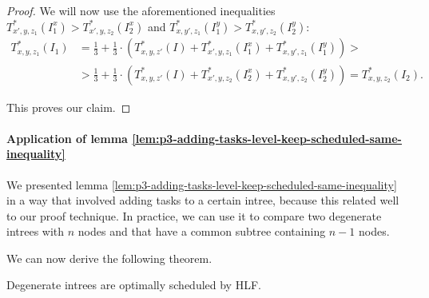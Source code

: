 \begin{proof}
  We will now use the aforementioned inequalities $T^*_{x',y,z_1}(I^x_{1}) > T^*_{x',y,z_2}(I^x_{2})$ and $T^*_{x,y',z_1}(I^y_{1}) > T^*_{x,y',z_2}(I^y_{2})$:
\begin{align*}
    T^*_{x,y,z_1}(I_1) & = 
      \frac{1}{3} + 
      \frac{1}{3}\cdot \left( 
        T_{x,y,z'}^*(I) + 
        T^*_{x',y,z_1}(I^x_{1}) +
        T^*_{x,y',z_1}(I^y_{1}) 
      \right)
      > 
      \\
      & >
      \frac{1}{3} + 
      \frac{1}{3}\cdot \left( 
        T_{x,y,z'}^*(I) + 
        T^*_{x',y,z_2}(I^x_{2}) +
        T^*_{x,y',z_2}(I^y_{2}) 
      \right) 
      = T^*_{x,y,z_2}(I_2).
  \end{align*}

  This proves our claim.    
\end{proof}

\paragraph{Application of lemma \ref{lem:p3-adding-tasks-level-keep-scheduled-same-inequality}}

We presented lemma \ref{lem:p3-adding-tasks-level-keep-scheduled-same-inequality} in a way that involved adding tasks to a certain intree, because this related well to our proof technique. In practice, we can use it to compare two degenerate intrees with $n$ nodes and that have a common subtree containing $n-1$ nodes.

We can now derive the following theorem.

\begin{theorem}
  Degenerate intrees are optimally scheduled by HLF.
\end{theorem}

